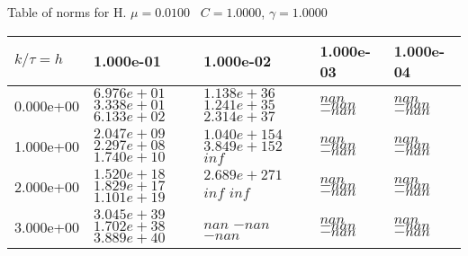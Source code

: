 \begin{center}
Table of norms for H. $\mu = 0.0100$ \, $C = 1.0000$, $\gamma = 1.0000$
  
\begin{tabular}{|p{1in}|p{1in}|p{1in}|p{1in}|p{1in}|} \hline
$k / \tau = h$ &1.000e-01 &1.000e-02 &1.000e-03 &1.000e-04 \\ \hline 
0.000e+00 & $6.976e+01$  $3.338e+01$  $6.133e+02$  & $1.138e+36$  $1.241e+35$  $2.314e+37$  & $nan$  $-nan$  $-nan$  & $nan$  $-nan$  $-nan$  \\ \hline 
1.000e+00 & $2.047e+09$  $2.297e+08$  $1.740e+10$  & $1.040e+154$  $3.849e+152$  $inf$  & $nan$  $-nan$  $-nan$  & $nan$  $-nan$  $-nan$  \\ \hline 
2.000e+00 & $1.520e+18$  $1.829e+17$  $1.101e+19$  & $2.689e+271$  $inf$  $inf$  & $nan$  $-nan$  $-nan$  & $nan$  $-nan$  $-nan$  \\ \hline 
3.000e+00 & $3.045e+39$  $1.702e+38$  $3.889e+40$  & $nan$  $-nan$  $-nan$  & $nan$  $-nan$  $-nan$  & $nan$  $-nan$  $-nan$  \\ \hline 

\end{tabular}\\[20pt]
\end{center}
